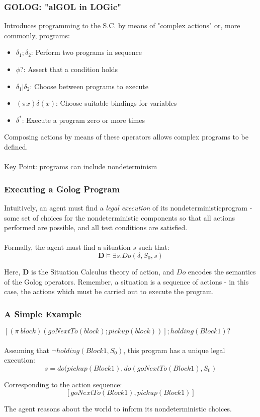 \documentclass{beamer}
\begin{document}
\begin{frame}
\frametitle{GOLOG: "alGOL in LOGic"}
Introduces programming to the S.C. by means of "complex actions" or,
more commonly, programs:
\begin{itemize}
  \pause
  \item $\delta_1;\delta_2$: Perform two programs in sequence
  \pause
  \item $\phi?$: Assert that a condition holds
  \pause
  \item $\delta_1|\delta_2$: Choose between programs to execute
  \pause
  \item $(\pi x)\delta(x)$: Choose suitable bindings for variables
  \pause
  \item $\delta^*$: Execute a program zero or more times
  \pause
\end{itemize}
Composing actions by means of these operators allows complex programs
to be defined.\\
\ \\
\pause
Key Point:  programs can include \alert{nondeterminism}
\end{frame}

\begin{frame}
\frametitle{Executing a Golog Program}
Intuitively, an agent must find a \emph{legal execution} of its nondeterministicprogram - some set of choices for the nondeterministic components so that all
actions performed are possible, and all test conditions are satisfied.\\
\ \\
Formally, the agent must find a situation $s$ such that:\[
\mathbf{D} \models \exists s . Do(\delta,S_0,s)\]

Here, $\mathbf{D}$ is the Situation Calculus theory of action, and $Do$
encodes the semantics of the Golog operators.  Remember, a situation is a sequence of actions - in this case, the actions which must be carried out to execute the program.
\end{frame}


\begin{frame}
\frametitle{A Simple Example}
$[(\pi\ block)(goNextTo(block);pickup(block))];holding(Block1)?$\\
\ \\
Assuming that $\neg holding(Block1,S_0)$, this program has a unique
legal execution:\[
s = do(pickup(Block1),do(goNextTo(Block1),S_0)\]

Corresponding to the action sequence:\[
[goNextTo(Block1), pickup(Block1)]\]

The agent reasons about the world to inform its nondeterministic choices.
\end{frame}
\end{document}
